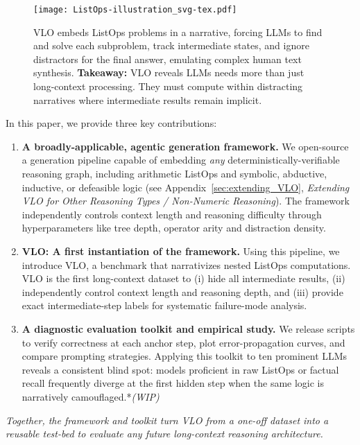 \documentclass{article}
\begin{document}
\begin{figure}[H]
  \centering
  \texttt{[image: ListOps-illustration\_svg-tex.pdf]}
  \caption{VLO embeds ListOps problems in a narrative, forcing LLMs to find and solve each subproblem, track intermediate states, and ignore distractors for the final answer, emulating complex human text synthesis. \textbf{Takeaway:} VLO reveals LLMs needs more than just long-context processing. They must compute within distracting narratives where intermediate results remain implicit.}
  \label{fig:ListOps_customization}
\end{figure}

In this paper, we provide three key contributions:

\begin{enumerate}
  \item \textbf{A broadly-applicable, agentic generation framework.}
        We open-source a generation pipeline capable of embedding \emph{any} deterministically-verifiable reasoning graph, including arithmetic ListOps and symbolic, abductive, inductive, or defeasible logic (see Appendix~\ref{sec:extending_VLO}, \textit{Extending VLO for Other Reasoning Types / Non-Numeric Reasoning}). The framework independently controls context length and reasoning difficulty through hyperparameters like tree depth, operator arity and distraction density.
  \item \textbf{VLO: A first instantiation of the framework.}
        Using this pipeline, we introduce VLO, a benchmark that narrativizes nested ListOps computations. VLO is the first long-context dataset to (i) hide all intermediate results, (ii) independently control context length and reasoning depth, and (iii) provide exact intermediate-step labels for systematic failure-mode analysis.
  \item \textbf{A diagnostic evaluation toolkit and empirical study.}
        We release scripts to verify correctness at each anchor step, plot error-propagation curves, and compare prompting strategies. Applying this toolkit to ten prominent LLMs reveals a consistent blind spot: models proficient in raw ListOps or factual recall frequently diverge at the first hidden step when the same logic is narratively camouflaged.*\textit{(WIP)}
\end{enumerate}

\noindent\hspace{3.5em}\begin{minipage}{\dimexpr\textwidth-3.5em}
  \emph{Together, the framework and toolkit turn VLO from a one-off dataset into a reusable test-bed to evaluate any future long-context reasoning architecture.}
\end{minipage}
\end{document}
